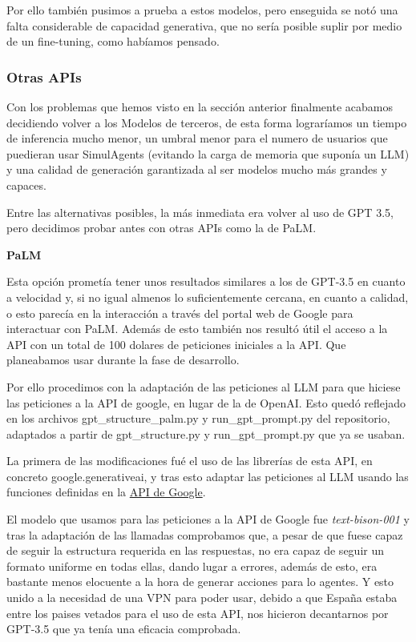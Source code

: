 Por ello también pusimos a prueba a estos modelos, pero enseguida se notó una falta considerable de capacidad generativa, que no sería posible suplir por medio de un fine-tuning, como habíamos pensado.

\subsubsection{Otras APIs}

Con los problemas que hemos visto en la sección anterior finalmente acabamos decidiendo volver a los Modelos de terceros, de esta forma lograríamos un tiempo de inferencia mucho menor, un umbral menor para el numero de usuarios que puedieran usar SimulAgents (evitando la carga de memoria que suponía un LLM) y una calidad de generación garantizada al ser modelos mucho más grandes y capaces.

Entre las alternativas posibles, la más inmediata era volver al uso de GPT 3.5, pero decidimos probar antes con otras APIs como la de PaLM.

\textbf{PaLM}

Esta opción prometía tener unos resultados similares a los de GPT-3.5 en cuanto a velocidad y, si no igual almenos lo suficientemente cercana, en cuanto a calidad, o esto parecía en la interacción a través del portal web de Google para interactuar con PaLM. Además de esto también nos resultó útil el acceso a la API con un total de 100 dolares de peticiones iniciales a la API. Que planeabamos usar durante la fase de desarrollo.

Por ello procedimos con la adaptación de las peticiones al LLM para que hiciese las peticiones a la API de google, en lugar de la de OpenAI. Esto quedó reflejado en los archivos gpt\_structure\_palm.py y run\_gpt\_prompt.py del repositorio, adaptados a partir de gpt\_structure.py y run\_gpt\_prompt.py que ya se usaban.

La primera de las modificaciones fué el uso de las librerías de esta API, en concreto google.generativeai, y tras esto adaptar las peticiones al LLM usando las funciones definidas en la \href{https://ai.google.dev/palm_docs}{API de Google}.

El modelo que usamos para las peticiones a la API de Google fue \textit{text-bison-001} y tras la adaptación de las llamadas comprobamos que, a pesar de que fuese capaz de seguir la estructura requerida en las respuestas, no era capaz de seguir un formato uniforme en todas ellas, dando lugar a errores, además de esto, era bastante menos elocuente a la hora de generar acciones para lo agentes. Y esto unido a la necesidad de una VPN para poder usar, debido a que España estaba entre los paises vetados para el uso de esta API, nos hicieron decantarnos por GPT-3.5 que ya tenía una eficacia comprobada.

